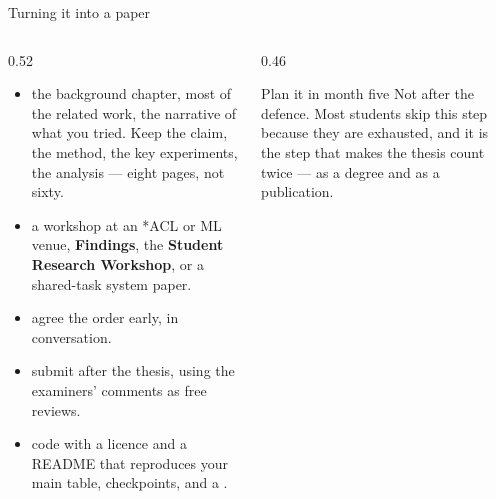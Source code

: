 \documentclass[aspectratio=169,11pt]{beamer}
\begin{document}
\begin{frame}{Turning it into a paper}
\begin{columns}[T]
\begin{column}{0.52\textwidth}
\footnotesize
\begin{itemize}
  \item {} the background chapter, most of the related work,
        the narrative of what you tried. Keep the claim, the method, the key
        experiments, the analysis --- eight pages, not sixty.
  \item {} a workshop at an *ACL or ML venue, \textbf{Findings}, the
        \textbf{Student Research Workshop}, or a shared-task system paper.
  \item {} agree the order early, in conversation.
  \item {} submit after the thesis, using the examiners' comments
        as free reviews.
  \item {} code with a licence and a README that reproduces your
        main table, checkpoints, and a .
\end{itemize}
\end{column}
\begin{column}{0.46\textwidth}
\begin{block}{Plan it in month five}
\footnotesize
Not after the defence. Most students skip this step because they are
exhausted, and it is the step that makes the thesis count twice --- as a
degree and as a publication.
\end{block}
\end{column}
\end{columns}
\end{frame}
\end{document}
